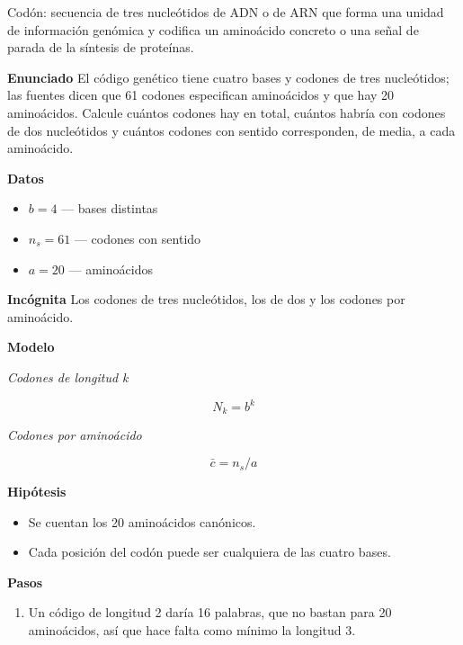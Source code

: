 \documentclass{book}
\begin{document}
\begin{tcolorbox}[title={Definición}, studiumdef, breakable]

Codón: secuencia de tres nucleótidos de ADN o de ARN que forma una unidad de información genómica y codifica un aminoácido concreto o una señal de parada de la síntesis de proteínas.

\end{tcolorbox}

\begin{tcolorbox}[title={Problema resuelto}, studiumworked, breakable]

\noindent\textbf{Enunciado}
El código genético tiene cuatro bases y codones de tres nucleótidos; las fuentes dicen que 61 codones especifican aminoácidos y que hay 20 aminoácidos. Calcule cuántos codones hay en total, cuántos habría con codones de dos nucleótidos y cuántos codones con sentido corresponden, de media, a cada aminoácido.


\noindent\textbf{Datos}
\begin{itemize}
\item $b = 4$ — bases distintas
\item $n_{s} = 61$ — codones con sentido
\item $a = 20$ — aminoácidos
\end{itemize}

\noindent\textbf{Incógnita}
Los codones de tres nucleótidos, los de dos y los codones por aminoácido.


\noindent\textbf{Modelo}

\noindent\textit{Codones de longitud k}

\[
N_k = b^{k}
\]

\noindent\textit{Codones por aminoácido}

\[
\bar{c} = n_s / a
\]

\noindent\textbf{Hipótesis}
\begin{itemize}
\item Se cuentan los 20 aminoácidos canónicos.
\item Cada posición del codón puede ser cualquiera de las cuatro bases.
\end{itemize}

\noindent\textbf{Pasos}
\begin{enumerate}
\item
Un código de longitud 2 daría 16 palabras, que no bastan para 20 aminoácidos, así que hace falta como mínimo la longitud 3.


\end{enumerate}
\end{tcolorbox}
\end{document}
